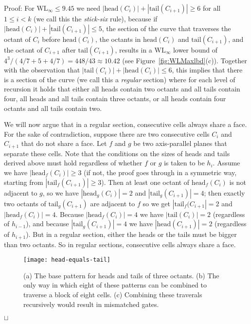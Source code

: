 \documentclass[11pt,a4paper]{article}
\def\WLMax{\ensuremath{\mathrm{WL}_\infty}\xspace}
\def\tail{\ensuremath{\mathrm{tail}}\xspace}
\def\head{\ensuremath{\mathrm{head}}\xspace}
\newenvironment{proof}{Proof:}{\qed}
\def\squareforqed{\hbox{\rlap{$\sqcap$}$\sqcup$}}
\def\qed{\ifmmode\squareforqed\else{\unskip\nobreak\hfil
\penalty50\hskip1em\null\nobreak\hfil\squareforqed
\parfillskip=0pt\finalhyphendemerits=0\endgraf}\fi}
\begin{document}
\begin{proof}
For $\WLMax \leq 9.45$ we need $|\head(C_i)| + |\tail(C_{i+1})| \geq 6$ for all $1 \leq i < k$ (we call this the \emph{stick-six} rule), because if $|\head(C_i)| + |\tail(C_{i+1})| \leq 5$, the section of the curve that traverses the octant of $C_i$ before $\head(C_i)$, the octants in $\head(C_i)$ and $\tail(C_{i+1})$, and the octant of $C_{i+1}$ after $\tail(C_{i+1})$, results in a $\WLMax$ lower bound of $4^3 / (4/7 + 5 + 4/7) = 448 / 43 \approx 10.42$ (see Figure~\ref{fig:WLMaxlbd}(c)). Together with the observation that $|\tail(C_i)| + |\head(C_i)| \leq 6$, this implies that there is a section of the curve (we call this a \emph{regular} section) where for each level of recursion it holds that either all heads contain two octants and all tails contain four, all heads and all tails contain three octants, or all heads contain four octants and all tails contain two.

We will now argue that in a regular section, consecutive cells always share a face. For the sake of contradiction, suppose there are two consecutive cells $C_i$ and $C_{i+1}$ that do not share a face. Let $f$ and $g$ be two axis-parallel planes that separate these cells. Note that the conditions on the sizes of heads and tails derived above must hold regardless of whether $f$ or $g$ is taken to be $h_i$. Assume we have $|\head_f(C_i)| \geq 3$ (if not, the proof goes through in a symmetric way, starting from $|\tail_f(C_{i+1})| \geq 3$). Then at least one octant of $\head_f(C_i)$ is not adjacent to $g$, so we have $|\head_g(C_i)| = 2$ and $|\tail_g(C_{i+1})| = 4$; then exactly two octants of $\tail_g(C_{i+1})$ are adjacent to $f$ so we get $|\tail_f(C_{i+1}| = 2$ and $|\head_f(C_i)| = 4$. Because $|\head_f(C_i)| = 4$ we have $|\tail(C_i)| = 2$ (regardless of $h_{i-1}$), and because $|\tail_g(C_{i+1})| = 4$ we have $|\head(C_{i+1})| = 2$ (regardless of $h_{i+1}$). But in a regular section, either the heads or the tails must be bigger than two octants. So in regular sections, consecutive cells always share a face.

\begin{figure}
\centering
\texttt{[image: head-equals-tail]}
\caption{(a) The base pattern for heads and tails of three octants.\quad
(b) The only way in which eight of these patterns can be combined to traverse a block of eight cells.\quad
(c) Combining these traverals recursively would result in mismatched gates.}
\label{fig:WLMaxlbd2}
\end{figure}


\end{proof}
\end{document}
